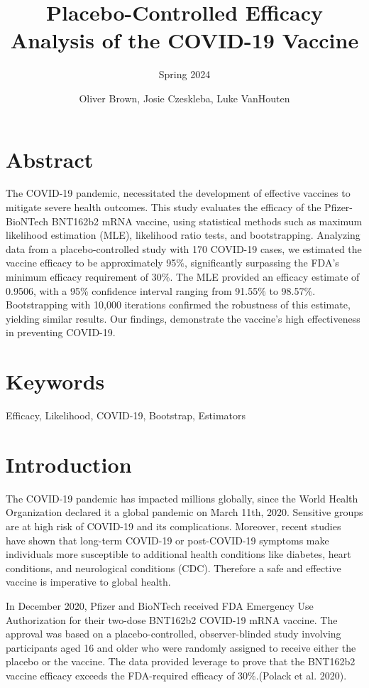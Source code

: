 \documentclass[
  11pt,
]{article}
\title{Placebo-Controlled Efficacy Analysis of the COVID-19 Vaccine}
\subtitle{Spring 2024}
\author{Oliver Brown, Josie Czeskleba, Luke VanHouten}
\date{}
\begin{document}
\maketitle

\hypertarget{abstract}{%
\section{Abstract}\label{abstract}}

The COVID-19 pandemic, necessitated the development of effective
vaccines to mitigate severe health outcomes. This study evaluates the
efficacy of the Pfizer-BioNTech BNT162b2 mRNA vaccine, using statistical
methods such as maximum likelihood estimation (MLE), likelihood ratio
tests, and bootstrapping. Analyzing data from a placebo-controlled study
with 170 COVID-19 cases, we estimated the vaccine efficacy to be
approximately 95\%, significantly surpassing the FDA's minimum efficacy
requirement of 30\%. The MLE provided an efficacy estimate of 0.9506,
with a 95\% confidence interval ranging from 91.55\% to 98.57\%.
Bootstrapping with 10,000 iterations confirmed the robustness of this
estimate, yielding similar results. Our findings, demonstrate the
vaccine's high effectiveness in preventing COVID-19.

\hypertarget{keywords}{%
\section{Keywords}\label{keywords}}

Efficacy, Likelihood, COVID-19, Bootstrap, Estimators

\hypertarget{introduction}{%
\section{Introduction}\label{introduction}}

The COVID-19 pandemic has impacted millions globally, since the World
Health Organization declared it a global pandemic on March 11th, 2020.
Sensitive groups are at high risk of COVID-19 and its complications.
Moreover, recent studies have shown that long-term COVID-19 or
post-COVID-19 symptoms make individuals more susceptible to additional
health conditions like diabetes, heart conditions, and neurological
conditions (CDC). Therefore a safe and effective vaccine is imperative
to global health.

In December 2020, Pfizer and BioNTech received FDA Emergency Use
Authorization for their two-dose BNT162b2 COVID-19 mRNA vaccine. The
approval was based on a placebo-controlled, observer-blinded study
involving participants aged 16 and older who were randomly assigned to
receive either the placebo or the vaccine. The data provided leverage to
prove that the BNT162b2 vaccine efficacy exceeds the FDA-required
efficacy of 30\%.(Polack et al. 2020).
\end{document}
